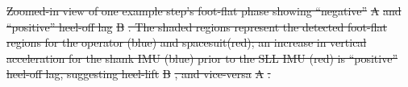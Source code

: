 \documentclass[defaultstyle,11pt]{comps}
\providecommand{\DIFdeltex}[1]{{\protect\color{red}\sout{#1}}}                      %
\providecommand{\DIFaddbegin}{} %
\providecommand{\DIFaddend}{} %
\providecommand{\DIFdelbegin}{} %
\providecommand{\DIFdelend}{} %
\providecommand{\DIFaddbeginFL}{} %
\providecommand{\DIFaddendFL}{} %
\providecommand{\DIFdelbeginFL}{} %
\providecommand{\DIFdelendFL}{} %
\providecommand{\DIFdel}[1]{\texorpdfstring{\DIFdeltex{#1}}{}} %
\newcommand{\DIFscaledelfig}{0.5}
\newlength{\DIFdelgraphicswidth} %
\newlength{\DIFdelgraphicsheight} %
\newcommand{\DIFaddincludegraphics}[2][]{{\color{blue}\fbox{\DIFOincludegraphics[#1]{#2}}}} %
\newcommand{\DIFdelincludegraphics}[2][]{%
\sbox{\DIFdelgraphicsbox}{\DIFOincludegraphics[#1]{#2}}%
\settoboxwidth{\DIFdelgraphicswidth}{\DIFdelgraphicsbox} %
\settoboxtotalheight{\DIFdelgraphicsheight}{\DIFdelgraphicsbox} %
\scalebox{\DIFscaledelfig}{%
\parbox[b]{\DIFdelgraphicswidth}{\usebox{\DIFdelgraphicsbox}\\[-\baselineskip] \rule{\DIFdelgraphicswidth}{0em}}\llap{\resizebox{\DIFdelgraphicswidth}{\DIFdelgraphicsheight}{%
\setlength{\unitlength}{\DIFdelgraphicswidth}%
\begin{picture}(1,1)%
\thicklines\linethickness{2pt} %
{\color[rgb]{1,0,0}\put(0,0){\framebox(1,1){}}}%
{\color[rgb]{1,0,0}\put(0,0){\line( 1,1){1}}}%
{\color[rgb]{1,0,0}\put(0,1){\line(1,-1){1}}}%
\end{picture}%
}\hspace*{3pt}}} %
} %
\DeclareRobustCommand{\DIFaddbegin}{\DIFOaddbegin \let\includegraphics\DIFaddincludegraphics} %
\DeclareRobustCommand{\DIFaddend}{\DIFOaddend \let\includegraphics\DIFOincludegraphics} %
\DeclareRobustCommand{\DIFdelbegin}{\DIFOdelbegin \let\includegraphics\DIFdelincludegraphics} %
\DeclareRobustCommand{\DIFdelend}{\DIFOaddend \let\includegraphics\DIFOincludegraphics} %
\DeclareRobustCommand{\DIFaddbeginFL}{\DIFOaddbeginFL \let\includegraphics\DIFaddincludegraphics} %
\DeclareRobustCommand{\DIFaddendFL}{\DIFOaddendFL \let\includegraphics\DIFOincludegraphics} %
\DeclareRobustCommand{\DIFdelbeginFL}{\DIFOdelbeginFL \let\includegraphics\DIFdelincludegraphics} %
\DeclareRobustCommand{\DIFdelendFL}{\DIFOaddendFL \let\includegraphics\DIFOincludegraphics} %
\begin{document}



{%
\DIFdel{Zoomed-in view of one example step's foot-flat phase showing ``negative'' }%
\DIFdel{A}%
\DIFdel{and ``positive'' heel-off lag }%
\DIFdel{B}%
\DIFdel{. The shaded regions represent the detected foot-flat regions for the operator (blue) and spacesuit(red); an increase in vertical acceleration for the shank IMU (blue) prior to the SLL IMU (red) is ``positive'' heel-off lag, suggesting heel-lift }%
\DIFdel{B}%
\DIFdel{, and vice-versa }%
\DIFdel{A}%
\DIFdel{.}}


\end{document}
